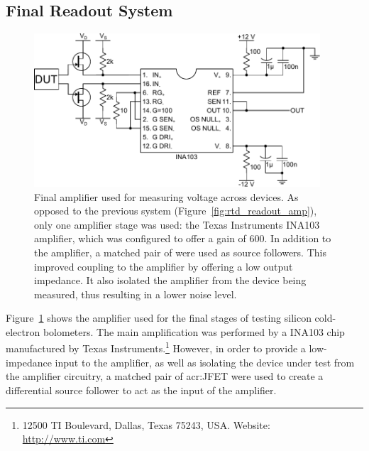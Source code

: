 \subsection{Final Readout System}\label{ssec:final_readout}
\begin{figure}[t]
\begin{center}
\includegraphics[width = 0.95\textwidth]{figures/final_amp}
\caption[Final voltage Readout Amplifier]{Final amplifier used for measuring voltage across devices. As opposed to the previous system (Figure~\ref{fig:rtd_readout_amp}), only one amplifier stage was used: the Texas Instruments INA103 amplifier, which was configured to offer a gain of $600$. In addition to the amplifier, a matched pair of  were used as source followers. This improved coupling to the amplifier by offering a low output impedance. It also isolated the amplifier from the device being measured, thus resulting in a lower noise level.}
\label{fig:finalAmp}
\end{center}
\end{figure}
Figure~\ref{fig:finalAmp} shows the amplifier used for the final stages of testing silicon cold-electron bolometers. The main amplification was performed by a INA103 chip manufactured by Texas Instruments.\footnote{12500 TI Boulevard,
Dallas, Texas 75243, USA. Website: \url{http://www.ti.com}} However, in order to provide a low-impedance input to the amplifier, as well as isolating the device under test from the amplifier circuitry, a matched pair of \gls{acr:JFET} were used to create a differential source follower to act as the input of the amplifier. 
\par 
